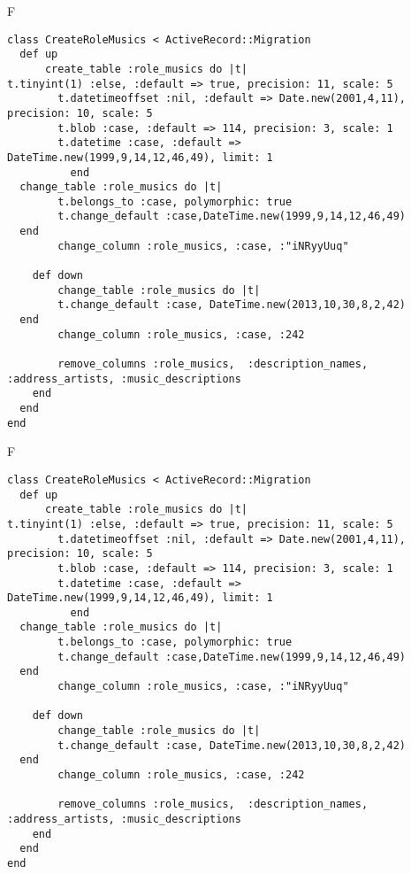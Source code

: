 F
\begin{verbatim}
class CreateRoleMusics < ActiveRecord::Migration
  def up
	  create_table :role_musics do |t|
t.tinyint(1) :else, :default => true, precision: 11, scale: 5
		t.datetimeoffset :nil, :default => Date.new(2001,4,11), precision: 10, scale: 5
		t.blob :case, :default => 114, precision: 3, scale: 1
		t.datetime :case, :default => DateTime.new(1999,9,14,12,46,49), limit: 1
		  end
  change_table :role_musics do |t|
		t.belongs_to :case, polymorphic: true
 		t.change_default :case,DateTime.new(1999,9,14,12,46,49)
  end
 		change_column :role_musics, :case, :"iNRyyUuq"
   
	def down
		change_table :role_musics do |t|
		t.change_default :case, DateTime.new(2013,10,30,8,2,42)
  end
 		change_column :role_musics, :case, :242
   
		remove_columns :role_musics,  :description_names, :address_artists, :music_descriptions 
    end 
  end
end

\end{verbatim}

F
\begin{verbatim}
class CreateRoleMusics < ActiveRecord::Migration
  def up
	  create_table :role_musics do |t|
t.tinyint(1) :else, :default => true, precision: 11, scale: 5
		t.datetimeoffset :nil, :default => Date.new(2001,4,11), precision: 10, scale: 5
		t.blob :case, :default => 114, precision: 3, scale: 1
		t.datetime :case, :default => DateTime.new(1999,9,14,12,46,49), limit: 1
		  end
  change_table :role_musics do |t|
		t.belongs_to :case, polymorphic: true
 		t.change_default :case,DateTime.new(1999,9,14,12,46,49)
  end
 		change_column :role_musics, :case, :"iNRyyUuq"
   
	def down
		change_table :role_musics do |t|
		t.change_default :case, DateTime.new(2013,10,30,8,2,42)
  end
 		change_column :role_musics, :case, :242
   
		remove_columns :role_musics,  :description_names, :address_artists, :music_descriptions 
    end 
  end
end

\end{verbatim}

